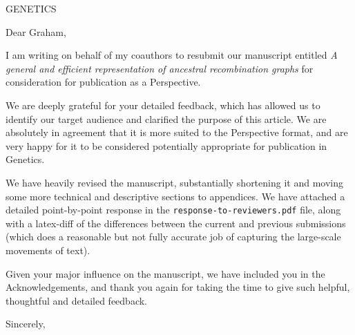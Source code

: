 \documentclass{letter}
\begin{document}
\begin{letter}{GENETICS}

\opening{Dear Graham,}

I am writing on behalf of my coauthors to resubmit our 
manuscript entitled
\emph{A general and efficient representation of ancestral recombination graphs}
for consideration for publication as a Perspective.

We are deeply grateful for your detailed feedback, which has allowed us 
to identify our target audience and clarified the purpose of this article.
We are absolutely in agreement that it is more suited to the Perspective
format, and are very happy for it to be considered potentially appropriate
for publication in Genetics.

We have heavily revised the manuscript, substantially shortening it
and moving some more technical and descriptive sections to appendices.
We have attached a detailed point-by-point response in the 
\texttt{response-to-reviewers.pdf} file, along with a 
latex-diff of the differences between the current and previous submissions
(which does a reasonable but not fully accurate job of capturing the large-scale
movements of text).

Given your major influence on the manuscript, we have included you in the
Acknowledgements, and thank you again for taking the time to give
such helpful, thoughtful and detailed feedback.

\closing{Sincerely,}

\end{letter}
\end{document}
